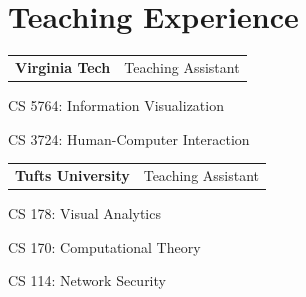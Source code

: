 \documentclass[11pt,letterpaper]{article}
\begin{document}
\section*{Teaching Experience}
\begin{minipage}[t]{0.48\linewidth}
\begin{tabularx}{\linewidth}{@{}Xr@{}}
  \textbf{Virginia Tech} & {\small Teaching Assistant}
\end{tabularx}
CS 5764: Information Visualization\par
CS 3724: Human-Computer Interaction\par
\end{minipage}\hfill
\begin{minipage}[t]{0.48\linewidth}
\begin{tabularx}{\linewidth}{@{}Xr@{}}
  \textbf{Tufts University} & {\small Teaching Assistant}
\end{tabularx}
CS 178: Visual Analytics\par
CS 170: Computational Theory\par
CS 114: Network Security\par
\end{minipage}
\end{document}
